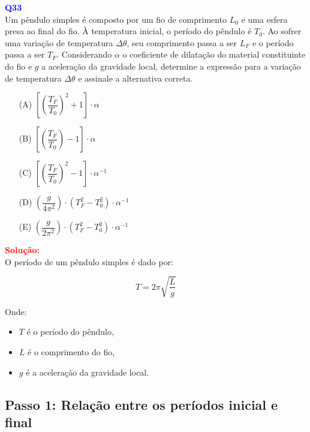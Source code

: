 \documentclass[a4paper,12pt]{article}
\begin{document}
\begin{flushleft}
\textbf{\textcolor{blue}{\Large Q33}}\\

Um pêndulo simples é composto por um fio de comprimento $L_0$ e uma esfera presa ao final do fio. À temperatura inicial, o período do 
pêndulo é $T_0$. Ao sofrer uma variação de temperatura $\Delta \theta$, seu comprimento passa a ser $L_F$ e o período passa a ser $T_F$. 
Considerando $\alpha$ o coeficiente de dilatação do material constituinte do fio e $g$ a aceleração da gravidade local, determine a 
expressão para a variação de temperatura $\Delta \theta$ e assinale a alternativa correta.


\begin{itemize}
\item[(A)] $\left[\left( \dfrac{T_F}{T_0} \right)^2 + 1 \right] \cdot \alpha$
\item[(B)] $\left[ \left( \dfrac{T_F}{T_0} \right) - 1 \right] \cdot \alpha$
\item[(C)] $\left[ \left( \dfrac{T_F}{T_0} \right)^2 - 1 \right] \cdot \alpha^{-1}$
\item[(D)] $\left(\dfrac{g}{4\pi^2} \right) \cdot \left( T_F^2 - T_0^2 \right) \cdot \alpha^{-1}$
\item[(E)] $\left(\dfrac{g}{2\pi^2} \right) \cdot \left( T_F^2 - T_0^2 \right) \cdot \alpha^{-1}$
\end{itemize}

\vspace{0.5cm}

\textcolor{red}{\textbf{Solução:}}\\

O período de um pêndulo simples é dado por:

\begin{equation}
T = 2\pi \sqrt{\frac{L}{g}}
\end{equation}

Onde:
\begin{itemize}
    \item $T$ é o período do pêndulo,
    \item $L$ é o comprimento do fio,
    \item $g$ é a aceleração da gravidade local.
\end{itemize}

\subsection*{Passo 1: Relação entre os períodos inicial e final}


\end{flushleft}
\end{document}
